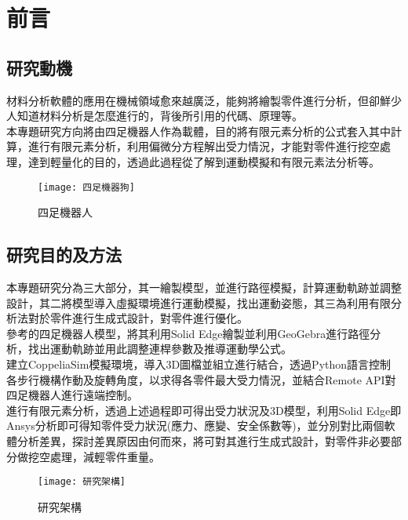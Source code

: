 \chapter{前言}
\renewcommand{\baselinestretch}{10.0} %
\setcounter{page}{1}  %
\fontsize{14pt}{2.5pt}\sectionef

\section{研究動機}
材料分析軟體的應用在機械領域愈來越廣泛，能夠將繪製零件進行分析，但卻鮮少人知道材料分析是怎麼進行的，背後所引用的代碼、原理等。\\
本專題研究方向將由四足機器人作為載體，目的將有限元素分析的公式套入其中計算，進行有限元素分析，利用偏微分方程解出受力情況，才能對零件進行挖空處理，達到輕量化的目的，透過此過程從了解到運動模擬和有限元素法分析等。\\

\begin{figure}[hbt!]
\begin{center}
\texttt{[image: 四足機器狗]}
\caption{\Large 四足機器人}\label{四足機器狗}
\end{center}
\end{figure}
\section{研究目的及方法}
本專題研究分為三大部分，其一繪製模型，並進行路徑模擬，計算運動軌跡並調整設計，其二將模型導入虛擬環境進行運動模擬，找出運動姿態，其三為利用有限分析法對於零件進行生成式設計，對零件進行優化。\\
參考的四足機器人模型，將其利用Solid Edge繪製並利用GeoGebra進行路徑分析，找出運動軌跡並用此調整連桿參數及推導運動學公式。\\
建立CoppeliaSim模擬環境，導入3D圖檔並組立進行結合，透過Python語言控制各步行機構作動及旋轉角度，以求得各零件最大受力情況，並結合Remote API對四足機器人進行遠端控制。\\
進行有限元素分析，透過上述過程即可得出受力狀況及3D模型，利用Solid Edge即Ansys分析即可得知零件受力狀況(應力、應變、安全係數等)，並分別對比兩個軟體分析差異，探討差異原因由何而來，將可對其進行生成式設計，對零件非必要部分做挖空處理，減輕零件重量。\\

\begin{figure}[hbt!]
\begin{center}
\texttt{[image: 研究架構]}
\caption{\Large 研究架構}\label{研究架構}
\end{center}
\end{figure}
\newpage

